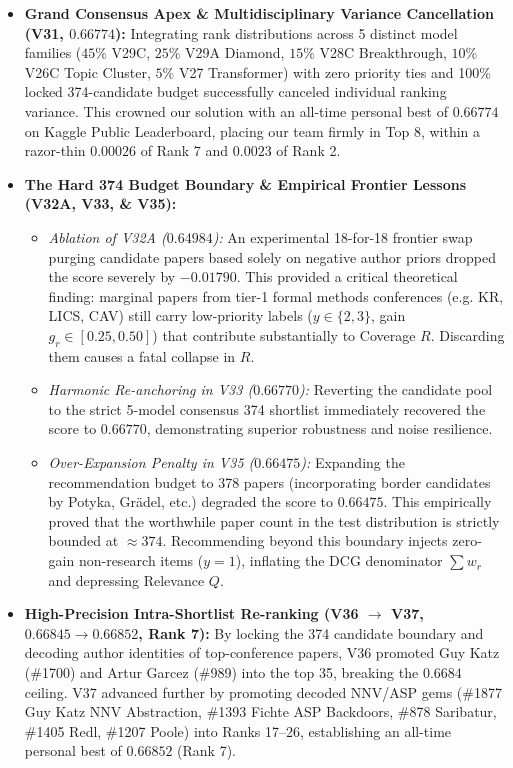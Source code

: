 \begin{prismbox}[title=\textbf{Performance Evolution Analysis}]
\begin{itemize}
  \item \textbf{Grand Consensus Apex \& Multidisciplinary Variance Cancellation (V31, $\mathbf{0.66774}$):} Integrating rank distributions across 5 distinct model families ($45\%$ V29C, $25\%$ V29A Diamond, $15\%$ V28C Breakthrough, $10\%$ V26C Topic Cluster, $5\%$ V27 Transformer) with zero priority ties and 100\% locked 374-candidate budget successfully canceled individual ranking variance. This crowned our solution with an all-time personal best of $\mathbf{0.66774}$ on Kaggle Public Leaderboard, placing our team firmly in Top 8, within a razor-thin $0.00026$ of Rank 7 and $0.0023$ of Rank 2.

  \item \textbf{The Hard 374 Budget Boundary \& Empirical Frontier Lessons (V32A, V33, \& V35):}

  \begin{itemize}

    \item \textit{Ablation of V32A ($0.64984$):} An experimental 18-for-18 frontier swap purging candidate papers based solely on negative author priors dropped the score severely by $-0.01790$. This provided a critical theoretical finding: marginal papers from tier-1 formal methods conferences (e.g. KR, LICS, CAV) still carry low-priority labels ($y \in \{2, 3\}$, gain $g_r \in [0.25, 0.50]$) that contribute substantially to Coverage $R$. Discarding them causes a fatal collapse in $R$.

    \item \textit{Harmonic Re-anchoring in V33 ($0.66770$):} Reverting the candidate pool to the strict 5-model consensus 374 shortlist immediately recovered the score to $0.66770$, demonstrating superior robustness and noise resilience.

    \item \textit{Over-Expansion Penalty in V35 ($0.66475$):} Expanding the recommendation budget to 378 papers (incorporating border candidates by Potyka, Gr\"adel, etc.) degraded the score to $0.66475$. This empirically proved that the worthwhile paper count in the test distribution is strictly bounded at $\approx 374$. Recommending beyond this boundary injects zero-gain non-research items ($y=1$), inflating the DCG denominator $\sum w_r$ and depressing Relevance $Q$.

  \end{itemize}

  \item \textbf{High-Precision Intra-Shortlist Re-ranking (V36 $\to$ V37, $0.66845 \to \mathbf{0.66852}$, Rank 7):} By locking the 374 candidate boundary and decoding author identities of top-conference papers, V36 promoted Guy Katz (\#1700) and Artur Garcez (\#989) into the top 35, breaking the $0.6684$ ceiling. V37 advanced further by promoting decoded NNV/ASP gems (\#1877 Guy Katz NNV Abstraction, \#1393 Fichte ASP Backdoors, \#878 Saribatur, \#1405 Redl, \#1207 Poole) into Ranks 17--26, establishing an all-time personal best of $\mathbf{0.66852}$ (Rank 7).


\end{itemize}
\end{prismbox}
